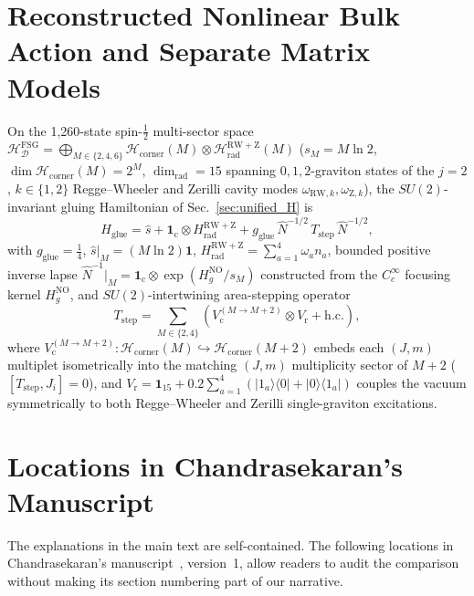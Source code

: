 \documentclass[onecolumn,11pt,aps,prd,amsmath,amssymb,nofootinbib,floatfix]{revtex4-2}
\newcommand{\scrD}{\mathscr{D}}
\newcommand{\calH}{\mathcal{H}}
\begin{document}
\section{Reconstructed Nonlinear Bulk Action and Separate Matrix Models}\label{app:explicit_action}



On the 1,260-state spin-$\frac{1}{2}$ multi-sector space $\calH_{\scrD}^{\mathrm{FSG}}=\bigoplus_{M\in\{2,4,6\}}\calH_{\mathrm{corner}}(M)\otimes\calH_{\mathrm{rad}}^{\mathrm{RW+Z}}(M)$ ($s_M=M\ln 2$, $\dim\calH_{\mathrm{corner}}(M)=2^M$, $\dim_{\mathrm{rad}}=15$ spanning $0,1,2$-graviton states of the $j=2$, $k\in\{1,2\}$ Regge--Wheeler and Zerilli cavity modes $\omega_{\mathrm{RW},k},\omega_{\mathrm{Z},k}$), the $SU(2)$-invariant gluing Hamiltonian of Sec.~\ref{sec:unified_H} is
\begin{equation}\label{eq:explicit_HFSG}
H_{\mathrm{glue}} = \hat{s} + \mathbf{1}_{\mathrm{c}}\otimes H_{\mathrm{rad}}^{\mathrm{RW+Z}}
+ g_{\mathrm{glue}}\,\widehat{N}^{-1/2}\,T_{\mathrm{step}}\,\widehat{N}^{-1/2},
\end{equation}
with $g_{\mathrm{glue}}=\frac{1}{4}$, $\hat{s}|_M=(M\ln 2)\mathbf{1}$, $H_{\mathrm{rad}}^{\mathrm{RW+Z}}=\sum_{a=1}^4 \omega_a n_a$, bounded positive inverse lapse $\widehat{N}^{-1}|_M=\mathbf{1}_{\mathrm{c}}\otimes\exp(H_g^{\mathrm{NO}}/s_M)$ constructed from the $C^\infty_c$ focusing kernel $H_g^{\mathrm{NO}}$, and $SU(2)$-intertwining area-stepping operator
\begin{equation}\label{eq:explicit_Tstep}
T_{\mathrm{step}} = \sum_{M\in\{2,4\}}\!\left(V_{\mathrm{c}}^{(M\to M+2)}\otimes V_{\mathrm{r}} + \mathrm{h.c.}\right),
\end{equation}
where $V_{\mathrm{c}}^{(M\to M+2)}:\calH_{\mathrm{corner}}(M)\hookrightarrow\calH_{\mathrm{corner}}(M+2)$ embeds each $(J,m)$ multiplet isometrically into the matching $(J,m)$ multiplicity sector of $M+2$ ($[T_{\mathrm{step}},J_i]=0$), and $V_{\mathrm{r}}=\mathbf{1}_{15}+0.2\sum_{a=1}^4(|1_a\rangle\langle 0|+|0\rangle\langle 1_a|)$ couples the vacuum symmetrically to both Regge--Wheeler and Zerilli single-graviton excitations.


\section{Locations in Chandrasekaran's Manuscript}\label{app:comparison}

The explanations in the main text are self-contained. The following locations in Chandrasekaran's manuscript~\cite{Chandrasekaran2026}, version~1, allow readers to audit the comparison without making its section numbering part of our narrative.
\end{document}
